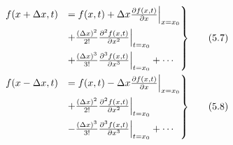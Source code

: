 \documentclass[fleqn,10pt]{SelfArx} %
\begin{document}

\begin{align*}
	\begin{rcases}
		f(x + \Delta x,t) & = f(x,t) + \Delta x\frac{\partial f(x,t)}{\partial x}\Big{|}_{x=x_0}                     \\
		                  & + \frac{(\Delta x)^2}{2!} \frac{\partial^2 f(x,t)}{\partial x^2}\Big{|}_{t=x_0}          \\
		                  & + \frac{(\Delta x)^3}{3!} \frac{\partial^3 f(x,t)}{\partial x^3}\Big{|}_{t=x_0} + \cdots
	\end{rcases} & \tag{5.7} \label{eq:forwarddiff_xt} \\
	\begin{rcases}
		f(x - \Delta x,t) & = f(x,t) - \Delta x\frac{\partial f(x,t)}{\partial x}\Big{|}_{x=x_0}                     \\
		                  & + \frac{(\Delta x)^2}{2!} \frac{\partial^2 f(x,t)}{\partial x^2}\Big{|}_{t=x_0}          \\
		                  & - \frac{(\Delta x)^3}{3!} \frac{\partial^3 f(x,t)}{\partial x^3}\Big{|}_{t=x_0} + \cdots
	\end{rcases} & \tag{5.8} \label{eq:backwarddiff_xt}
\end{align*}
\end{document}
